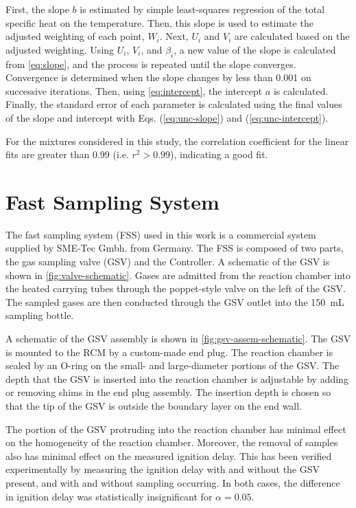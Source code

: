 \documentclass[../main.tex]{subfiles}
\begin{document}
First, the slope $b$ is estimated by simple least-squares regression of the total
specific heat on the temperature. Then, this slope is used to estimate the
adjusted weighting of each point, $W_i$. Next, $U_i$ and $V_i$ are calculated
based on the adjusted weighting. Using $U_i$, $V_i$, and $\beta_i$, a new value of the
slope is calculated from \cref{eq:slope}, and the process is repeated until the slope converges.
Convergence is determined when the slope changes by less than 0.001 on successive
iterations. Then, using \cref{eq:intercept}, the intercept $a$ is calculated.
Finally, the standard error of each parameter is
calculated using the final values of the slope and intercept with Eqs. (\ref{eq:unc-slope})
and (\ref{eq:unc-intercept}).

For the mixtures considered in
this study, the correlation coefficient for the linear fits are greater than
0.99 (i.e. $r^2 > 0.99$), indicating a good fit.

\section{Fast Sampling System}
\label{sec:fast-sampling}

The fast sampling system (FSS) used in this work is a commercial system supplied by
SME-Tec Gmbh. from Germany. The FSS is composed of two parts, the gas sampling valve
(GSV) and the Controller. A schematic of the GSV is shown in \cref{fig:valve-schematic}.
Gases are admitted from the reaction chamber into the heated carrying tubes
through the poppet-style valve on the left of the GSV. The sampled gases are then
conducted through the GSV outlet into the \SI{150}{\milli\liter} sampling bottle.

A schematic of the GSV assembly is shown in \cref{fig:gsv-assem-schematic}.
The GSV is mounted to the RCM by a custom-made end plug. The reaction chamber
is sealed by an O-ring on the small- and large-diameter portions of the GSV.
The depth that the GSV is inserted into the reaction chamber is adjustable
by adding or removing shims in the end plug assembly. The insertion depth
is chosen so that the tip of the GSV is outside the boundary layer on the
end wall.

The portion of the GSV protruding into the reaction chamber has minimal
effect on the homogeneity of the reaction chamber. Moreover, the removal of
samples also has minimal effect on the measured ignition delay.
This has been verified experimentally by measuring the ignition delay with
and without the GSV present, and with and without sampling occurring.
In both cases, the difference in ignition delay was statistically insignificant
for $\alpha=0.05$.
\end{document}

